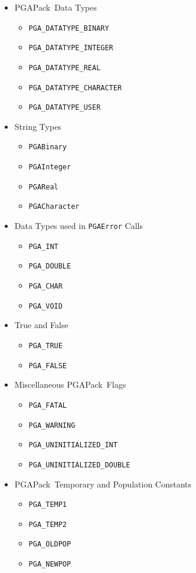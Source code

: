 \documentclass{report}
\newcommand{\pga}{PGAPack}
\begin{document}
\begin{itemize}

\item \pga\ Data Types
\begin{itemize}
\item {\tt PGA\_DATATYPE\_BINARY}
\item {\tt PGA\_DATATYPE\_INTEGER}
\item {\tt PGA\_DATATYPE\_REAL}
\item {\tt PGA\_DATATYPE\_CHARACTER}
\item {\tt PGA\_DATATYPE\_USER}
\end{itemize}
    
\item String Types
\begin{itemize}
\item {\tt PGABinary}
\item {\tt PGAInteger}
\item {\tt PGAReal}
\item {\tt PGACharacter}
\end{itemize}

\item Data Types used in {\tt PGAError} Calls
\begin{itemize}
\item {\tt PGA\_INT}
\item {\tt PGA\_DOUBLE}
\item {\tt PGA\_CHAR}
\item {\tt PGA\_VOID}
\end{itemize}

\item True and False
\begin{itemize}
\item {\tt PGA\_TRUE}
\item {\tt PGA\_FALSE}
\end{itemize}

\item Miscellaneous \pga\ Flags
\begin{itemize}
\item {\tt PGA\_FATAL}
\item {\tt PGA\_WARNING}
\item {\tt PGA\_UNINITIALIZED\_INT}
\item {\tt PGA\_UNINITIALIZED\_DOUBLE}
\end{itemize}

\item \pga\ Temporary and Population Constants
\begin{itemize}
\item {\tt PGA\_TEMP1}
\item {\tt PGA\_TEMP2}
\item {\tt PGA\_OLDPOP}
\item {\tt PGA\_NEWPOP}
\end{itemize}



\end{itemize}
\end{document}
